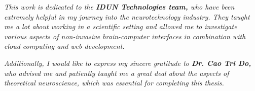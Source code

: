 \begin{dedication}

    \textit{This work is dedicated to the \textbf{IDUN Technologies team,} who have been extremely helpful in my journey into the neurotechnology industry. They taught me a lot about working in a scientific setting and allowed me to investigate various aspects of non-invasive brain-computer interfaces in combination with cloud computing and web development.}

    \hfill \break

    \textit{Additionally, I would like to express my sincere gratitude to \textbf{Dr. Cao Tri Do,} who advised me and patiently taught me a great deal about the aspects of theoretical neuroscience, which was essential for completing this thesis.}

\end{dedication}
